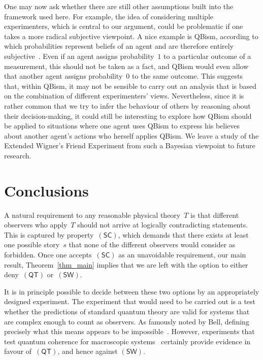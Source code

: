 \documentclass{article}
\theoremstyle{plain}
\theoremstyle{definition}
\newcommand*{\QT}{\mathsf{(QT)}}
\newcommand*{\SW}{\mathsf{(SW)}}
\newcommand*{\SelfCons}{\mathsf{(SC)}}
\begin{document}
One may now ask whether there are still other assumptions built into the framework used here. For example, the idea of considering multiple experimenters, which is central to our argument,  could be problematic if one takes a more radical subjective viewpoint. A nice example is QBism, according to which probabilities represent beliefs of an agent and are therefore entirely subjective~\cite{FuMeSc14}. Even if an agent assigns probability~$1$ to a particular outcome of a measurement, this should  not be taken as a fact, and QBism would even allow that another agent assigns probability~$0$ to the same outcome. This suggests that, within QBism, it may not be sensible to carry out an analysis that is based on the combination of different experimenters' views. Nevertheless, since it is rather common that we try to infer the behaviour of others by reasoning about their decision-making, it could still be interesting to explore  how QBism should be applied to situations where one agent uses QBism to express his believes about another agent's actions who herself applies QBism.  We leave a study of the  Extended Wigner's Friend Experiment from such a  Bayesian viewpoint to future research. 

\section{Conclusions} \label{sec_conclusions}

A natural requirement to any reasonable physical theory~$T$ is that different observers who apply~$T$ should not arrive at logically contradicting statements.  This is captured by property~$\SelfCons$, which demands that there exists at least one possible story~$s$ that none of the different observers would consider as forbidden.  Once one accepts~$\SelfCons$  as an unavoidable requirement, our main result, Theorem~\ref{thm_main} implies that we are left with the option to either deny~$\QT$ or~$\SW$. 

It is in principle possible to decide between these two options by an appropriately designed experiment. The experiment that would need to be carried out is a test whether the predictions of standard quantum theory are valid for systems that are complex enough to count as observers. As famously noted by Bell, defining precisely what this means appears to be impossible~\cite{Bell90}. However, experiments that test quantum coherence for macroscopic systems~\cite{ArnHor14} certainly provide evidence in favour of~$\QT$, and hence against $\SW$.
\end{document}
